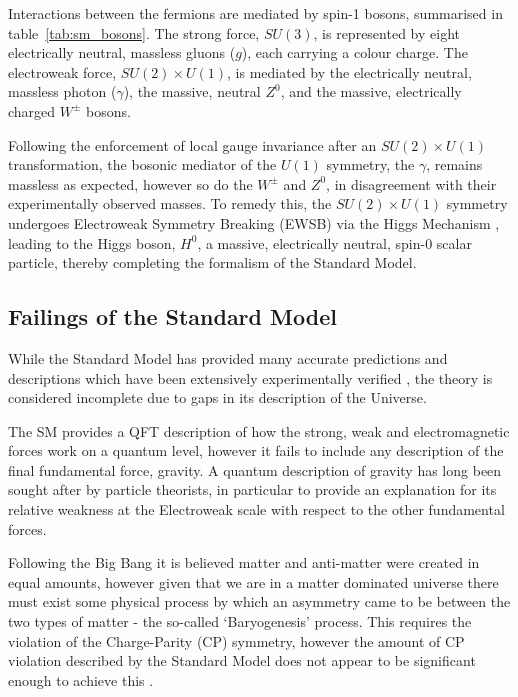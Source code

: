 Interactions between the fermions are mediated by spin-1 bosons, summarised in
table~\ref{tab:sm_bosons}. The strong 
force, $SU(3)$, is represented by eight electrically neutral, massless gluons 
($g$), each carrying a colour charge. The electroweak force, $SU(2)\times U(1)$,
is
mediated by the electrically neutral, massless photon ($\gamma$), the massive,
neutral $Z^0$, and the massive, electrically charged $W^{\pm}$ bosons.

Following the enforcement of local gauge invariance after an
$SU(2)\times U (1)$ transformation,
the bosonic mediator of the $U(1)$ symmetry, the $\gamma$, remains massless as
expected, however so do the $W^{\pm}$ and $Z^0$, in disagreement with their
experimentally observed masses. To remedy this, the $SU(2)\times U(1)$ symmetry
undergoes Electroweak Symmetry Breaking (EWSB) via the Higgs Mechanism
\cite{PhysRevLett.13.321,PhysRevLett.13.508,PhysRevLett.13.585}, 
leading to the Higgs boson, $H^0$, a massive, electrically neutral, spin-0
scalar particle, thereby completing the formalism of the Standard Model.



\subsection{Failings of the Standard Model}

While the Standard Model has provided many accurate predictions and descriptions
which have been extensively experimentally verified \cite{Baak:2014ora}, the
theory is considered incomplete due to gaps in its description of the Universe.

The SM provides a QFT description of how the strong, weak and electromagnetic
forces work on a quantum level, however it fails to include any description of
the final fundamental force, gravity. A quantum description of gravity has long
been sought after by particle theorists, in particular to provide an explanation
for its relative weakness at the Electroweak scale with respect to the other
fundamental forces.

Following the Big Bang it is believed matter and anti-matter were created in
equal amounts, however given that we are in a matter dominated universe there
must exist some physical process by which an asymmetry came to be between the
two types of matter - the so-called `Baryogenesis' process. This requires the
violation of the Charge-Parity (CP) symmetry,
however the amount of CP violation described by the Standard Model
does not appear to be significant enough to achieve this
\cite{Riotto:1999yt, Hou:2008xd}.

